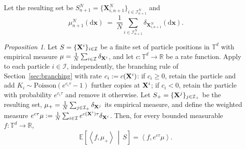 \documentclass[a4paper,fleqn]{cas-sc}
\theoremstyle{definition}
\theoremstyle{remark}
\newtheorem{proposition}{Proposition}
\begin{document}
Let the resulting set be \(S_{n+1}^N=\{\mathbf X^N_{i,n+1}\}_{i\in\mathcal I^N_{n+1}}\) and
\[
\mu_{n+1}^{N}(\mathrm{d}\mathbf{x})
\;=\;
\frac{1}{N}\sum_{i\in\mathcal I^N_{n+1}}\delta_{\mathbf X^N_{i,n+1}}(\mathrm{d}\mathbf{x}).
\]


\begin{proposition}
    Let $S=\{\mathbf{X}^i\}_{i\in \mathcal I}$ be a finite set of particle positions in $\mathbb T^d$
    with empirical measure $\mu=\frac{1}{N}\sum_{i\in \mathcal I}\delta_{\mathbf{X}^i}$, and let
    $c:\mathbb T^d\to\mathbb R$ be a rate function. Apply to each particle $i\in\mathcal I$,
    independently, the branching rule of Section~\ref{sec:branching} with rate $c_i:=c(\mathbf{X}^i)$:
    if $c_i\ge0$, retain the particle and add $K_i\sim\mathrm{Poisson}(e^{c_i\tau}-1)$ further
    copies at $\mathbf{X}^i$; if $c_i<0$, retain the particle with probability $e^{c_i\tau}$ and remove
    it otherwise. Let $S_+=\{\mathbf{X}^j\}_{j\in \mathcal I_+}$ be the resulting set,
    $\mu_+=\frac{1}{N}\sum_{j\in \mathcal I_+}\delta_{\mathbf{X}^j}$ its empirical measure, and define the
    weighted measure $e^{c\tau}\mu:=\frac{1}{N}\sum_{i\in\mathcal I}e^{c(\mathbf{X}^i)\tau}\delta_{\mathbf{X}^i}$.
    Then, for every bounded measurable $f:\mathbb T^d\to\mathbb R$,
    \begin{equation}\label{eq:branch-mean}
        \mathbb E\!\left[\left<f, \mu_+\right>\,\middle|\,S\right] = \left<f,e^{c\tau}\mu\right>.
    \end{equation}
\label{prop:stochastic_branch}
\end{proposition}
\end{document}
